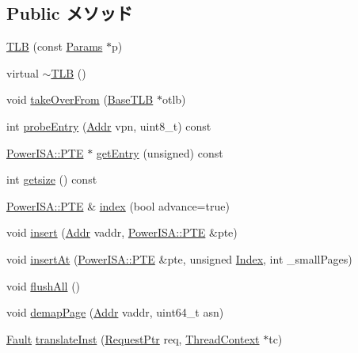 \subsection*{Public メソッド}
\begin{DoxyCompactItemize}
\item 
\hyperlink{classPowerISA_1_1TLB_acb886bd3c59f00c21be9ceaaf25dab97}{TLB} (const \hyperlink{classPowerISA_1_1TLB_a483872f6d75119b1124c758297acc6da}{Params} $\ast$p)
\item 
virtual \hyperlink{classPowerISA_1_1TLB_a18a1722ab7889997b15fd7b9fc33c7ff}{$\sim$TLB} ()
\item 
void \hyperlink{classPowerISA_1_1TLB_a15b6c15c1be2ca4de3e65772a02aa29f}{takeOverFrom} (\hyperlink{classBaseTLB}{BaseTLB} $\ast$otlb)
\item 
int \hyperlink{classPowerISA_1_1TLB_a4dd1511c095e58173f0f7b78eeded1fe}{probeEntry} (\hyperlink{base_2types_8hh_af1bb03d6a4ee096394a6749f0a169232}{Addr} vpn, uint8\_\-t) const 
\item 
\hyperlink{structPowerISA_1_1PTE}{PowerISA::PTE} $\ast$ \hyperlink{classPowerISA_1_1TLB_a3558ac34fa4e174033d1938edef03e4e}{getEntry} (unsigned) const 
\item 
int \hyperlink{classPowerISA_1_1TLB_ae121404a6cfcf714e05fe2231ce4c7fc}{getsize} () const 
\item 
\hyperlink{structPowerISA_1_1PTE}{PowerISA::PTE} \& \hyperlink{classPowerISA_1_1TLB_a966acb0c92e034836f2ee489cb83ddd3}{index} (bool advance=true)
\item 
void \hyperlink{classPowerISA_1_1TLB_a347b46782c03effd910740f90bd915b4}{insert} (\hyperlink{base_2types_8hh_af1bb03d6a4ee096394a6749f0a169232}{Addr} vaddr, \hyperlink{structPowerISA_1_1PTE}{PowerISA::PTE} \&pte)
\item 
void \hyperlink{classPowerISA_1_1TLB_a79de97f3cd3b55bcd2fbf31c5d3b8a12}{insertAt} (\hyperlink{structPowerISA_1_1PTE}{PowerISA::PTE} \&pte, unsigned \hyperlink{TypeDefines_8hh_a39642de41f3574937f399f4fab25ba18}{Index}, int \_\-smallPages)
\item 
void \hyperlink{classPowerISA_1_1TLB_aca1483a67aee5a91e442f7131d66bcbd}{flushAll} ()
\item 
void \hyperlink{classPowerISA_1_1TLB_a2d698ff909513b48a1263f8a5440e067}{demapPage} (\hyperlink{base_2types_8hh_af1bb03d6a4ee096394a6749f0a169232}{Addr} vaddr, uint64\_\-t asn)
\item 
\hyperlink{classRefCountingPtr}{Fault} \hyperlink{classPowerISA_1_1TLB_a072afd8ed455dade4c25a85510e5a4da}{translateInst} (\hyperlink{classRequest}{RequestPtr} req, \hyperlink{classThreadContext}{ThreadContext} $\ast$tc)

\end{DoxyCompactItemize}
